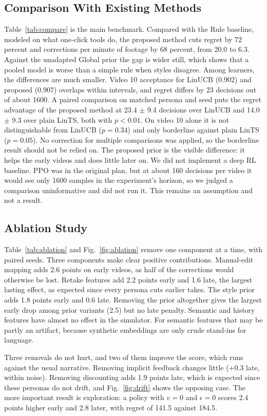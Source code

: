 \documentclass{ieeeaccess}
\begin{document}
\subsection{Comparison With Existing Methods}
Table~\ref{tab:compare} is the main benchmark. Compared with the Rule baseline, modeled on what one-click tools do, the proposed method cuts regret by 72 percent and corrections per minute of footage by 68 percent, from 20.0 to 6.3. Against the unadapted Global prior the gap is wider still, which shows that a pooled model is worse than a simple rule when styles disagree. Among learners, the differences are much smaller. Video 10 acceptance for LinUCB (0.902) and proposed (0.907) overlaps within intervals, and regret differs by 23 decisions out of about 1600. A paired comparison on matched persona and seed puts the regret advantage of the proposed method at 23.4 $\pm$ 9.4 decisions over LinUCB and 14.0 $\pm$ 9.3 over plain LinTS, both with $p<0.01$. On video 10 alone it is not distinguishable from LinUCB ($p=0.34$) and only borderline against plain LinTS ($p=0.05$). No correction for multiple comparisons was applied, so the borderline result should not be relied on. The proposed prior is the visible difference: it helps the early videos and does little later on. We did not implement a deep RL baseline. PPO was in the original plan, but at about 160 decisions per video it would see only 1600 samples in the experiment's horizon, so we judged a comparison uninformative and did not run it. This remains an assumption and not a result.

\subsection{Ablation Study}
Table~\ref{tab:ablation} and Fig.~\ref{fig:ablation} remove one component at a time, with paired seeds. Three components make clear positive contributions. Manual-edit mapping adds 2.6 points on early videos, as half of the corrections would otherwise be lost. Retake features add 2.2 points early and 1.6 late, the largest lasting effect, as expected since every persona cuts earlier takes. The style prior adds 1.8 points early and 0.6 late. Removing the prior altogether gives the largest early drop among prior variants (2.5) but no late penalty. Semantic and history features have almost no effect in the simulator. For semantic features that may be partly an artifact, because synthetic embeddings are only crude stand-ins for language.

Three removals do not hurt, and two of them improve the score, which runs against the usual narrative. Removing implicit feedback changes little (+0.3 late, within noise). Removing discounting adds 1.9 points late, which is expected since these personas do not drift, and Fig.~\ref{fig:drift} shows the opposing case. The more important result is exploration: a policy with $v=0$ and $\epsilon=0$ scores 2.4 points higher early and 2.8 later, with regret of 141.5 against 184.5.
\end{document}
